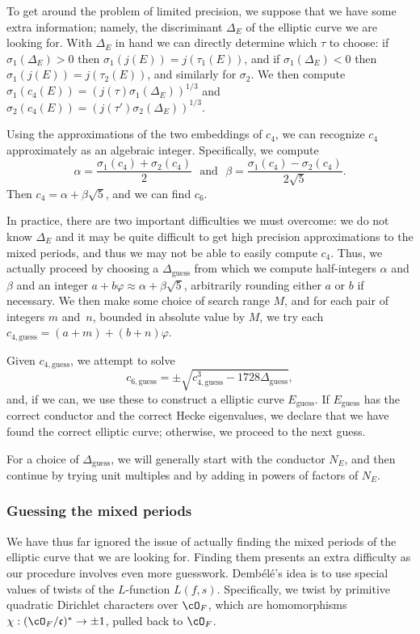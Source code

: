 \documentclass{amsart}
\newcommand{\fc}{\mathfrak{c}}
\newcommand{\OF}{\cO_F}
\newcommand{\dembele}{Demb\'el{\'e}\xspace}
\begin{document}
To get around the problem of limited precision, we suppose that we have some extra information; 
namely, the discriminant $\Delta_E$ of the elliptic curve we are looking for.  With $\Delta_E$ in
hand we can directly determine which $\tau$ to choose: if $\sigma_1(\Delta_E) > 0$ then
$\sigma_1(j(E)) = j(\tau_1(E))$, and if $\sigma_1(\Delta_E) < 0$ then $\sigma_1(j(E)) = j(\tau_2(E))$,
and similarly for $\sigma_2$. We then compute
$\sigma_1(c_4(E)) = (j(\tau) \sigma_1(\Delta_E))^{1/3}$
and $\sigma_2(c_4(E)) = (j(\tau') \sigma_2(\Delta_E))^{1/3}$.

Using the approximations of the two embeddings of $c_4$, we can recognize $c_4$ approximately
as an algebraic integer. Specifically, we compute
\[
    \alpha = \frac{\sigma_1(c_4) + \sigma_2(c_4)}{2}\ \ \  \text{and} \ \ \ 
    \beta = \frac{\sigma_1(c_4) - \sigma_2(c_4)}{2\sqrt{5}}.
\]
Then $c_4 = \alpha + \beta\sqrt{5}$, and we can find $c_6$.

\newcommand{\Deltaguess}{\Delta_{\textrm{guess}}}
\newcommand{\cfourguess}{c_{4,\textrm{guess}}}
\newcommand{\csixguess}{c_{6,\textrm{guess}}}
\newcommand{\Eguess}{E_\textrm{guess}}

In practice, there are two important difficulties we must overcome: we do not know
$\Delta_E$ and it may be quite difficult to get high precision approximations to the
mixed periods, and thus we may not be able to easily compute $c_4$. Thus, we actually
proceed by choosing a $\Deltaguess$ from which we
compute half-integers $\alpha$ and $\beta$ and an integer
$a + b\varphi \approx \alpha + \beta\sqrt5$, arbitrarily rounding either $a$ or $b$ if necessary.
We then make some choice of search range $M$, and for each pair of integers $m$ and~$n$,
bounded in absolute value by $M$, we try each $\cfourguess = (a + m) + (b + n)\varphi$.

Given $\cfourguess$, we attempt to solve
\[
    \csixguess = \pm \sqrt{ \cfourguess^3 - 1728 \Deltaguess },
\]
and, if we can, we use these to construct a elliptic curve $\Eguess$. If $\Eguess$ has
the correct conductor and the correct Hecke eigenvalues, we declare that
we have found the correct elliptic curve; otherwise, we proceed to the next guess.

For a choice of $\Deltaguess$, we will generally start with the conductor $N_E$,
and then continue by trying unit multiples and by adding in powers of factors of $N_E$.

\subsubsection{Guessing the mixed periods}
We have thus far ignored the issue of actually finding the mixed periods of the elliptic curve that
we are looking for. Finding them presents an extra difficulty as our procedure involves
even more guesswork. \dembele's idea is to use special values of twists of the $L$-function
$L(f, s)$. Specifically, we twist by primitive quadratic Dirichlet characters over $\OF$,
which are homomorphisms $\chi : (\OF/\fc)^* \rightarrow \pm1$, pulled back to $\OF$.
\end{document}
